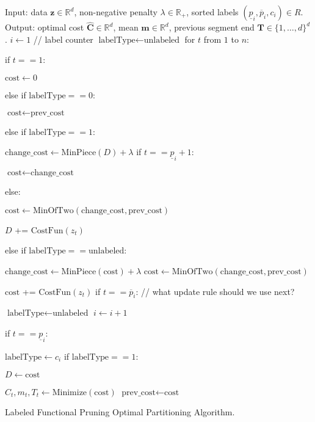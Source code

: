 \documentclass{article}
\newcommand{\RR}{\mathbb R}
\begin{document}
\begin{algorithm}[H]
\begin{algorithmic}[1]
\STATE Input: data $\mathbf z\in\mathbb R^d$, 
non-negative penalty $\lambda\in\RR_+$,
sorted labels $(\underline p_i, \overline p_i, c_i)\in R$.
\STATE Output: optimal cost $\hat{\mathbf C}\in\mathbb R^d$,
mean $\mathbf m\in\mathbb R^d$,
previous segment end $\mathbf T\in\{1,\dots,d\}^d$. 
\STATE $i\gets 1$ // label counter
\STATE $\text{labelType}\gets\text{unlabeled}$
\STATE for $t$ from $1$ to $n$:
\begin{ALC@g}
  \STATE if $t==1$:
  \begin{ALC@g}
    \STATE $\text{cost}\gets 0$
  \end{ALC@g}
  \STATE else if $\text{labelType}==0$:
  \begin{ALC@g}
    \STATE $\text{cost}\gets\text{prev\_cost}$
  \end{ALC@g}
  \STATE else if $\text{labelType}==1$:
  \begin{ALC@g}
    \STATE $\text{change\_cost}\gets \text{MinPiece}(D) + \lambda$
    \STATE if $t==\underline p_i+1$:
    \begin{ALC@g}
      \STATE $\text{cost}\gets\text{change\_cost}$
    \end{ALC@g}
    \STATE else:
    \begin{ALC@g}
      \STATE $\text{cost}\gets\text{MinOfTwo}(
      \text{change\_cost}, \text{prev\_cost})$
    \end{ALC@g}
    \STATE $D$ += $\text{CostFun}(z_t)$
  \end{ALC@g}
  \STATE else if $\text{labelType}==\text{unlabeled}$:
  \begin{ALC@g}
    \STATE $\text{change\_cost}\gets\text{MinPiece}(\text{cost}) + \lambda$
    \STATE $\text{cost}\gets\text{MinOfTwo}( 
    \text{change\_cost}, \text{prev\_cost})$
  \end{ALC@g}
  \STATE $\text{cost}$ += $\text{CostFun}(z_t)$
  \STATE if $t==\overline p_i$: // what update rule should we use next?
  \begin{ALC@g}
    \STATE $\text{labelType}\gets \text{unlabeled}$
    \STATE $i\gets i+1$
  \end{ALC@g}
  \STATE if $t==\underline p_i$:
  \begin{ALC@g}
    \STATE $\text{labelType}\gets c_i$
    \STATE if $\text{labelType}==1$:
    \begin{ALC@g}
      \STATE $D\gets \text{cost}$
    \end{ALC@g}
  \end{ALC@g}
  \STATE $\hat C_t, m_t, T_t\gets \text{Minimize}(\text{cost})$
  \STATE $\text{prev\_cost}\gets\text{cost}$
\end{ALC@g}
\caption{\label{algo:LabeledFPOP}Labeled Functional Pruning Optimal
  Partitioning Algorithm.}
\end{algorithmic}
\end{algorithm}
\end{document}
